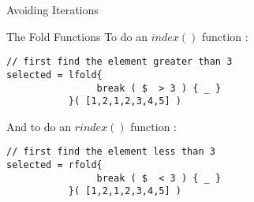 \begin{section}{Avoiding Iterations}
\begin{subsection}{The Fold Functions}
To do an $index()$ function : 

\begin{lstlisting}[style=JexlStyle]
// first find the element greater than 3
selected = lfold{ 
                break ( $  > 3 ) { _ }   
           }( [1,2,1,2,3,4,5] )
\end{lstlisting}

And to do an $rindex()$ function : 

\begin{lstlisting}[style=JexlStyle]
// first find the element less than 3
selected = rfold{ 
                break ( $  < 3 ) { _ }   
           }( [1,2,1,2,3,4,5] )
\end{lstlisting}

\end{subsection}
\end{section}
